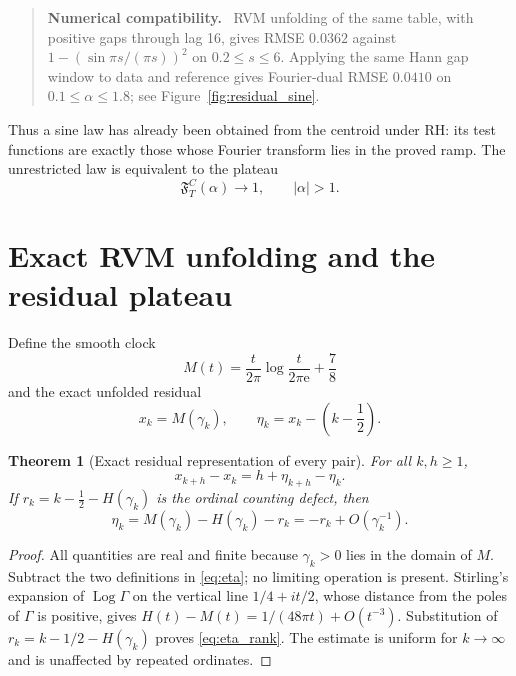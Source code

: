 \documentclass[11pt]{amsart}
\newtheorem{theorem}{Theorem}[section]
\theoremstyle{definition}
\theoremstyle{remark}
\newcommand{\ee}{\mathrm e}
\newcommand{\Log}{\operatorname{Log}}
\newenvironment{numericalcheck}
{\begin{quote}\small\noindent\textbf{Numerical compatibility.}\ }{\end{quote}}
\begin{document}
\begin{numericalcheck}
RVM unfolding of the same table, with positive gaps through lag 16, gives
RMSE $0.0362$ against
$1-(\sin\pi s/(\pi s))^2$ on $0.2\le s\le6$.  Applying the same Hann gap
window to data and reference gives Fourier-dual RMSE $0.0410$ on
$0.1\le\alpha\le1.8$; see Figure~\ref{fig:residual_sine}.
\end{numericalcheck}

Thus a sine law has already been obtained from the centroid under RH: its test
functions are exactly those whose Fourier transform lies in the proved ramp.
The unrestricted law is equivalent to the plateau
\begin{equation}\label{eq:plateau_goal}
\mathfrak F_T^C(\alpha)\longrightarrow1,
\qquad |\alpha|>1.
\end{equation}

\section{Exact RVM unfolding and the residual plateau}

Define the smooth clock
\begin{equation}\label{eq:Mclock}
M(t)=\frac{t}{2\pi}\log\frac{t}{2\pi\ee}+\frac78
\end{equation}
and the exact unfolded residual
\begin{equation}\label{eq:eta}
x_k=M(\gamma_k),
\qquad
\eta_k=x_k-\left(k-\frac12\right).
\end{equation}

\begin{theorem}[Exact residual representation of every pair]
\label{thm:residual_pair}
For all $k,h\geq1$,
\begin{equation}\label{eq:residual_pair}
\boxed{x_{k+h}-x_k=h+\eta_{k+h}-\eta_k.}
\end{equation}
If $r_k=k-\frac12-H(\gamma_k)$ is the ordinal counting defect, then
\begin{equation}\label{eq:eta_rank}
\eta_k=M(\gamma_k)-H(\gamma_k)-r_k=-r_k+O(\gamma_k^{-1}).
\end{equation}
\end{theorem}

\begin{proof}
All quantities are real and finite because $\gamma_k>0$ lies in the domain of
$M$.  Subtract the two definitions in \eqref{eq:eta}; no limiting operation is
present.  Stirling's expansion of $\Log\Gamma$ on the vertical line
$1/4+it/2$, whose distance from the poles of $\Gamma$ is positive, gives
$H(t)-M(t)=1/(48\pi t)+O(t^{-3})$.  Substitution of
$r_k=k-1/2-H(\gamma_k)$ proves \eqref{eq:eta_rank}.  The estimate is uniform
for $k\to\infty$ and is unaffected by repeated ordinates.
\end{proof}
\end{document}
